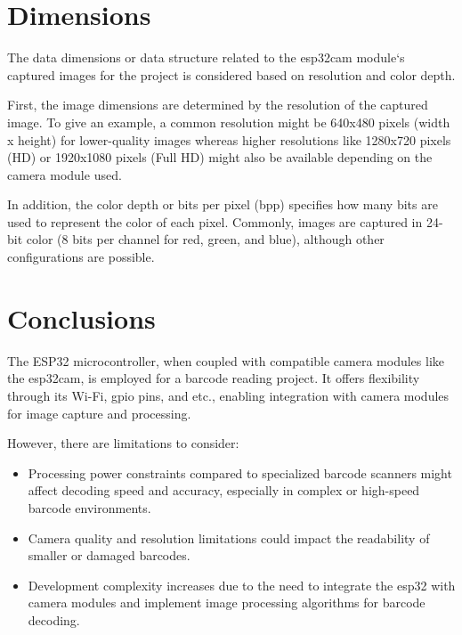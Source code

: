 \medskip

\section{Dimensions}
The data dimensions or data structure related to the \ac{esp32cam} module`s captured images for the project is considered based on resolution and color depth. 

\medskip

First, the image dimensions are determined by the resolution of the captured image. To give an example, a common resolution might be 640x480 pixels (width x height) for lower-quality images whereas higher resolutions like 1280x720 pixels (HD) or 1920x1080 pixels (Full HD) might also be available depending on the camera module used.

\medskip

In addition, the color depth or bits per pixel (bpp) specifies how many bits are used to represent the color of each pixel. Commonly, images are captured in 24-bit color (8 bits per channel for red, green, and blue), although other configurations are possible.

\medspace
\bigskip

\section{Conclusions}
The ESP32 microcontroller, when coupled with compatible camera modules like the \ac{esp32cam}, is employed for a barcode reading project. It offers flexibility through its Wi-Fi,  \ac{gpio} pins, and etc., enabling integration with camera modules for image capture and processing.

\medskip

However, there are limitations to consider:

\begin{itemize}
    \item Processing power constraints compared to specialized barcode scanners might affect decoding speed and accuracy, especially in complex or high-speed barcode environments.
    \item Camera quality and resolution limitations could impact the readability of smaller or damaged barcodes.
    \item Development complexity increases due to the need to integrate the \ac{esp32} with camera modules and implement image processing algorithms for barcode decoding.
\end{itemize}


